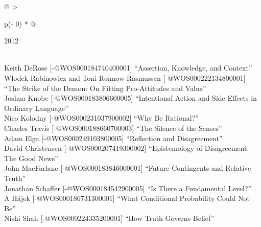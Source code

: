 \documentclass[
  10pt,
  letterpaper,
  DIV=11,
  numbers=noendperiod,
  twoside]{scrartcl}
\begin{document}
\begin{longtable}[]{@{}
  >{\raggedright\arraybackslash}p{(\columnwidth - 0\tabcolsep) * }@{}}

\caption{\label{tbl-top-ten-2003}Most cited articles published less than
ten years ago as of 2012.}

\tabularnewline

\toprule\noalign{}
\begin{minipage}[b]{\linewidth}\raggedright
2012
\end{minipage} \\
\midrule\noalign{}
\endhead
\bottomrule\noalign{}
\endlastfoot
Keith DeRose {[}-@WOS000184740400001{]} ``Assertion, Knowledge, and
Context'' \\
Wlodek Rabinowicz and Toni Rønnow‐Rasmussen {[}-@WOS000222134800001{]}
``The Strike of the Demon: On Fitting Pro-Attitudes and Value'' \\
Joshua Knobe {[}-@WOS000183806600005{]} ``Intentional Action and Side
Effects in Ordinary Language'' \\
Nico Kolodny {[}-@WOS000231037900002{]} ``Why Be Rational?'' \\
Charles Travis {[}-@WOS000188660700003{]} ``The Silence of the
Senses'' \\
Adam Elga {[}-@WOS000249103800005{]} ``Reflection and Disagreement'' \\
David Christensen {[}-@WOS000207419300002{]} ``Epistemology of
Disagreement: The Good News'' \\
John MacFarlane {[}-@WOS000183846000001{]} ``Future Contingents and
Relative Truth'' \\
Jonathan Schaffer {[}-@WOS000184542900005{]} ``Is There a Fundamental
Level?'' \\
A Hájek {[}-@WOS000186731300001{]} ``What Conditional Probability Could
Not Be'' \\
Nishi Shah {[}-@WOS000224335200001{]} ``How Truth Governs Belief'' \\

\end{longtable}
\end{document}
